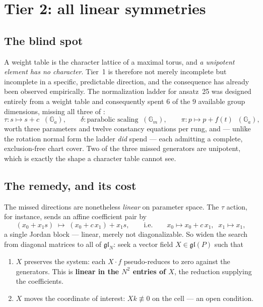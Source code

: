 \documentclass[11pt]{article}
\newcommand{\Gm}{\mathbb{G}_m}
\newcommand{\Ga}{\mathbb{G}_a}
\newcommand{\gl}{\mathfrak{gl}}
\theoremstyle{plain}
\theoremstyle{definition}
\theoremstyle{remark}
\begin{document}
\section{Tier 2: all linear symmetries}
\label{sec:tier2}

\subsection{The blind spot}

A weight table is the character lattice of a maximal torus, and \emph{a
unipotent element has no character}. Tier~1 is therefore not merely incomplete
but incomplete in a specific, predictable direction, and the consequence has
already been observed empirically. The normalization ladder for ansatz~25 was
designed entirely from a weight table and consequently spent $6$ of the $9$
available group dimensions, missing all three of
\cite{ansatz25}:
\[
  \tau : s \mapsto s + c \;\;(\Ga), \qquad
  \delta : \text{parabolic scaling} \;\;(\Gm), \qquad
  \pi : p \mapsto p + f(t) \;\;(\Ga),
\]
worth three parameters and twelve constancy equations per rung, and --- unlike
the rotation normal form the ladder \emph{did} spend --- each admitting a
complete, exclusion-free chart cover. Two of the three missed generators are
unipotent, which is exactly the shape a character table cannot see.

\subsection{The remedy, and its cost}

The missed directions are nonetheless \emph{linear} on parameter space. The
$\tau$ action, for instance, sends an affine coefficient pair by
\[
  (x_0 + x_1 s) \;\longmapsto\; (x_0 + c\,x_1) + x_1 s ,
  \qquad\text{i.e.}\qquad x_0 \mapsto x_0 + c\,x_1, \;\; x_1 \mapsto x_1 ,
\]
a single Jordan block --- linear, merely not diagonalizable. So widen the
search from diagonal matrices to all of $\gl_N$: seek a vector field
$X \in \gl(P)$ such that

\begin{enumerate}
\item[(i)] $X$ preserves the system: each $X \cdot f$ pseudo-reduces to zero
           against the generators. This is \textbf{linear in the $N^2$ entries
           of $X$}, the reduction supplying the coefficients.
\item[(ii)] $X$ moves the coordinate of interest: $X k \not\equiv 0$ on the
            cell --- an open condition.
\end{enumerate}
\end{document}
